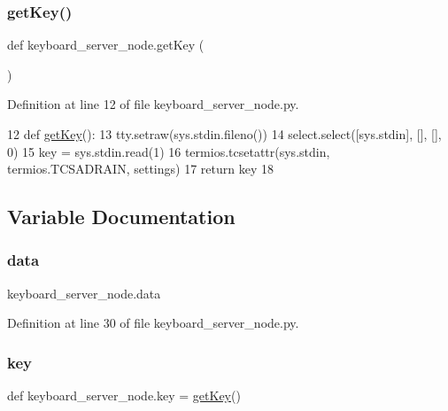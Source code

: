\subsubsection{\texorpdfstring{get\+Key()}{getKey()}}
{\footnotesize\ttfamily def keyboard\+\_\+server\+\_\+node.\+get\+Key (\begin{DoxyParamCaption}{ }\end{DoxyParamCaption})}



Definition at line 12 of file keyboard\+\_\+server\+\_\+node.\+py.


\begin{DoxyCode}
12 \textcolor{keyword}{def }\hyperlink{namespacekeyboard__server__node_abe4dc127c8bdf79333dfa931e556f6f7}{getKey}():
13     tty.setraw(sys.stdin.fileno())
14     select.select([sys.stdin], [], [], 0)
15     key = sys.stdin.read(1)
16     termios.tcsetattr(sys.stdin, termios.TCSADRAIN, settings)
17     \textcolor{keywordflow}{return} key
18 
\end{DoxyCode}


\subsection{Variable Documentation}
\mbox{\label{namespacekeyboard__server__node_abfec01745fb17e2aa813913bea03d707}} 
\subsubsection{\texorpdfstring{data}{data}}
{\footnotesize\ttfamily keyboard\+\_\+server\+\_\+node.\+data}



Definition at line 30 of file keyboard\+\_\+server\+\_\+node.\+py.

\mbox{\label{namespacekeyboard__server__node_af0ebd8a9e1564ddc13a227c727602466}} 
\subsubsection{\texorpdfstring{key}{key}}
{\footnotesize\ttfamily def keyboard\+\_\+server\+\_\+node.\+key = \hyperlink{namespacekeyboard__server__node_abe4dc127c8bdf79333dfa931e556f6f7}{get\+Key}()}



